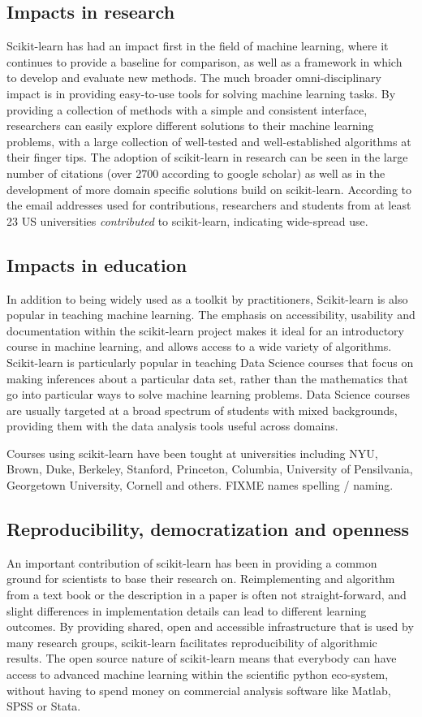 \subsection{Impacts in research}
Scikit-learn has had an impact first in the field of machine learning,
where it continues to provide a baseline for comparison, as well as a
framework in which to develop and evaluate new methods.
The much broader omni-disciplinary impact is in providing easy-to-use
tools for solving machine learning tasks. By providing a collection
of methods with a simple and consistent interface, researchers
can easily explore different solutions to their machine learning problems,
with a large collection of well-tested and well-established algorithms
at their finger tips.
The adoption of scikit-learn in research can be seen in the large number
of citations (over 2700 according to google scholar) as well as in the development
of more domain specific solutions build on scikit-learn.
According to the email addresses used for contributions, researchers and students
from at least 23 US universities \emph{contributed} to scikit-learn, indicating wide-spread use.

\subsection{Impacts in education}
In addition to being widely used as a toolkit by practitioners,
Scikit-learn is also popular in teaching machine learning.
The emphasis on accessibility, usability and documentation within
the scikit-learn project makes it ideal for an introductory
course in machine learning, and allows access to a wide variety
of algorithms. Scikit-learn is particularly popular in teaching
Data Science courses that focus on making inferences about
a particular data set, rather than the mathematics that go into
particular ways to solve machine learning problems.
Data Science courses are usually targeted at a broad spectrum
of students with mixed backgrounds, providing them
with the data analysis tools useful across domains.

Courses using scikit-learn have been tought at universities
including NYU, Brown, Duke, Berkeley, Stanford, Princeton,
Columbia, University of Pensilvania, Georgetown University, Cornell
and others. FIXME names spelling / naming.


\subsection{Reproducibility, democratization and openness}
An important contribution of scikit-learn has been in providing a common
ground for scientists to base their research on. Reimplementing
and algorithm from a text book or the description in a paper is often not
straight-forward, and slight differences in implementation details can
lead to different learning outcomes. By providing shared, open and 
accessible infrastructure that is used by many research groups,
scikit-learn facilitates reproducibility of algorithmic results.
The open source nature of scikit-learn means that everybody can have access
to advanced machine learning within the scientific python eco-system,
without having to spend money on commercial analysis software like Matlab,
SPSS or Stata.

